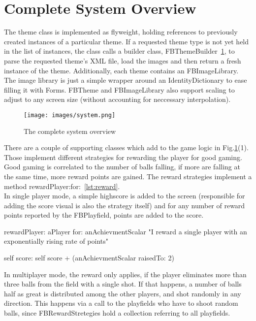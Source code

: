 \section{Complete System Overview}
%
The theme class is implemented as flyweight, holding references to previously 
created instances of a particular theme. If a requested theme type is not yet 
held in the list of instances, the class calls a builder class, 
FBThemeBuilder~\ref{fig:system}, to parse the requested theme's XML file, 
load the images and then return a fresh instance of the theme. Additionally, 
each theme contains an FBImageLibrary. The image library is just a simple 
wrapper around an IdentityDictionary to ease filling it with Forms. 
FBTheme and FBImageLibrary also support scaling to adjust to any screen 
size (without accounting for neccessary interpolation).
%
\begin{figure}[bt]
  \begin{center}
    \texttt{[image: images/system.png]}
  \end{center}
  \caption{The complete system overview}
  \label{fig:system}
\end{figure}
%
There are a couple of supporting classes which add to the game logic 
in Fig.\ref{fig:system}(1). Those implement different strategies for 
rewarding the player for good gaming. Good gaming is correlated to the 
number of balls falling, if more are falling at the same time, more 
reward points are gained.
The reward strategies implement a method
rewardPlayer:for:~\ref{lst:reward}.\\
In single player mode, a
simple highscore is added to the screen (responsible for adding the 
score visual is also the strategy itself) and for any number of 
reward points reported by the FBPlayfield, points are added to the 
score. 
%
\begin{listing}
rewardPlayer: aPlayer for: anAchievmentScalar
    "I reward a single player with an exponentially 
rising rate of points" 
    
    self score:
        self score + (anAchievmentScalar raisedTo: 2)
\end{listing}
%
In multiplayer mode, the reward only applies, if the player eliminates 
more than three balls from the field with a single shot. If that happens, 
a number of balls half as great is distributed among the other players,
and shot randomly in any direction. This happens via a call to 
the playfields who have to shoot random balls, since FBRewardStretegies
hold a collection referring to all playfields.

